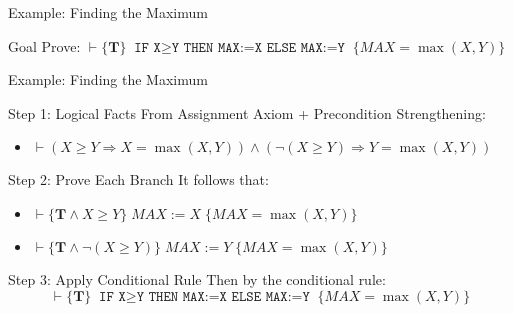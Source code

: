 \begin{frame}{Example: Finding the Maximum}
    \begin{block}{Goal}
        Prove: $\vdash \{\mathbf{T}\} \; \texttt{IF X$\geq$Y THEN MAX:=X ELSE MAX:=Y} \; \{MAX=\max(X,Y)\}$
    \end{block}
\end{frame}
\begin{frame}{Example: Finding the Maximum}

    \begin{block}{Step 1: Logical Facts}
        From Assignment Axiom + Precondition Strengthening:
        \begin{itemize}
            \item $\vdash (X \geq Y \Rightarrow X = \max(X,Y)) \wedge (\neg(X \geq Y) \Rightarrow Y = \max(X,Y))$
        \end{itemize}
    \end{block}
    
    \begin{block}{Step 2: Prove Each Branch}
        It follows that:
        \begin{itemize}
            \item $\vdash \{\mathbf{T} \wedge X \geq Y\} \; MAX:=X \; \{MAX=\max(X,Y)\}$
            \item $\vdash \{\mathbf{T} \wedge \neg(X \geq Y)\} \; MAX:=Y \; \{MAX=\max(X,Y)\}$
        \end{itemize}
    \end{block}
    
    \begin{block}{Step 3: Apply Conditional Rule}
        Then by the conditional rule:
        \[\vdash \{\mathbf{T}\} \; \texttt{IF X$\geq$Y THEN MAX:=X ELSE MAX:=Y} \; \{MAX=\max(X,Y)\}\]
    \end{block}
\end{frame}

